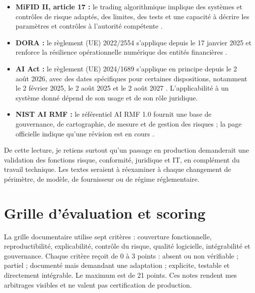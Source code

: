 \begin{itemize}
    \item \textbf{MiFID II, article 17 :} le trading algorithmique implique des systèmes et contrôles de risque adaptés, des limites, des tests et une capacité à décrire les paramètres et contrôles à l'autorité compétente \citep{mifidArticle17}.
    \item \textbf{DORA :} le règlement (UE) 2022/2554 s'applique depuis le 17 janvier 2025 et renforce la résilience opérationnelle numérique des entités financières \citep{dora2022}.
    \item \textbf{AI Act :} le règlement (UE) 2024/1689 s'applique en principe depuis le 2 août 2026, avec des dates spécifiques pour certaines dispositions, notamment le 2 février 2025, le 2 août 2025 et le 2 août 2027 \citep{euAiAct2024}. L'applicabilité à un système donné dépend de son usage et de son rôle juridique.
    \item \textbf{NIST AI RMF :} le référentiel AI RMF 1.0 fournit une base de gouvernance, de cartographie, de mesure et de gestion des risques ; la page officielle indique qu'une révision est en cours \citep{nistAirmf2023}.
\end{itemize}

De cette lecture, je retiens surtout qu'un passage en production demanderait une validation des fonctions risque, conformité, juridique et IT, en complément du travail technique. Les textes seraient à réexaminer à chaque changement de périmètre, de modèle, de fournisseur ou de régime réglementaire.

\section{Grille d'évaluation et scoring}

La grille documentaire utilise sept critères : couverture fonctionnelle, reproductibilité, explicabilité, contrôle du risque, qualité logicielle, intégrabilité et gouvernance. Chaque critère reçoit de 0 à 3 points : absent ou non vérifiable ; partiel ; documenté mais demandant une adaptation ; explicite, testable et directement intégrable. Le maximum est de 21 points. Ces notes rendent mes arbitrages visibles et ne valent pas certification de production.

